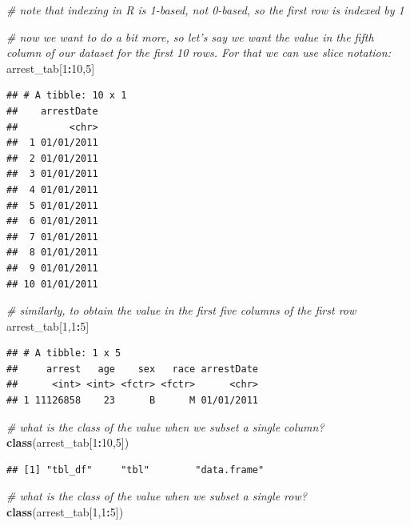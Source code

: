 \documentclass[12pt,]{book}
\newenvironment{Shaded}{\begin{snugshade}}{\end{snugshade}}
\newcommand{\KeywordTok}[1]{\textcolor[rgb]{0.13,0.29,0.53}{\textbf{#1}}}
\newcommand{\DecValTok}[1]{\textcolor[rgb]{0.00,0.00,0.81}{#1}}
\newcommand{\CommentTok}[1]{\textcolor[rgb]{0.56,0.35,0.01}{\textit{#1}}}
\newcommand{\OperatorTok}[1]{\textcolor[rgb]{0.81,0.36,0.00}{\textbf{#1}}}
\newcommand{\NormalTok}[1]{#1}
\theoremstyle{definition}
\theoremstyle{definition}
\theoremstyle{remark}
\begin{document}
\begin{Shaded}
\begin{Highlighting}[]
\CommentTok{# note that indexing in R is 1-based, not 0-based, so the first row is indexed by 1}

\CommentTok{# now we want to do a bit more, so let's say we want the value in the fifth column of our dataset for the first 10 rows. For that we can use slice notation:}
\NormalTok{arrest_tab[}\DecValTok{1}\OperatorTok{:}\DecValTok{10}\NormalTok{,}\DecValTok{5}\NormalTok{]}
\end{Highlighting}
\end{Shaded}

\begin{verbatim}
## # A tibble: 10 x 1
##    arrestDate
##         <chr>
##  1 01/01/2011
##  2 01/01/2011
##  3 01/01/2011
##  4 01/01/2011
##  5 01/01/2011
##  6 01/01/2011
##  7 01/01/2011
##  8 01/01/2011
##  9 01/01/2011
## 10 01/01/2011
\end{verbatim}

\begin{Shaded}
\begin{Highlighting}[]
\CommentTok{# similarly, to obtain the value in the first five columns of the first row}
\NormalTok{arrest_tab[}\DecValTok{1}\NormalTok{,}\DecValTok{1}\OperatorTok{:}\DecValTok{5}\NormalTok{]}
\end{Highlighting}
\end{Shaded}

\begin{verbatim}
## # A tibble: 1 x 5
##     arrest   age    sex   race arrestDate
##      <int> <int> <fctr> <fctr>      <chr>
## 1 11126858    23      B      M 01/01/2011
\end{verbatim}

\begin{Shaded}
\begin{Highlighting}[]
\CommentTok{# what is the class of the value when we subset a single column?}
\KeywordTok{class}\NormalTok{(arrest_tab[}\DecValTok{1}\OperatorTok{:}\DecValTok{10}\NormalTok{,}\DecValTok{5}\NormalTok{])}
\end{Highlighting}
\end{Shaded}

\begin{verbatim}
## [1] "tbl_df"     "tbl"        "data.frame"
\end{verbatim}

\begin{Shaded}
\begin{Highlighting}[]
\CommentTok{# what is the class of the value when we subset a single row?}
\KeywordTok{class}\NormalTok{(arrest_tab[}\DecValTok{1}\NormalTok{,}\DecValTok{1}\OperatorTok{:}\DecValTok{5}\NormalTok{])}
\end{Highlighting}
\end{Shaded}
\end{document}
